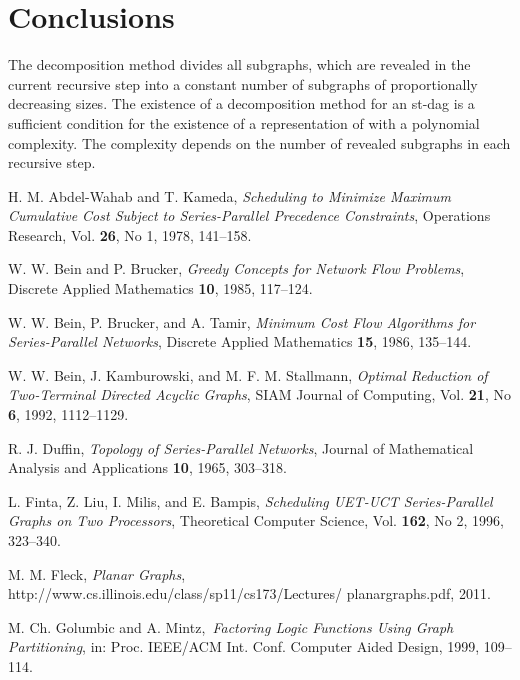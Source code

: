 \documentclass[11pt]{article}\usepackage{amsmath}
\begin{document}
\section{Conclusions}

The decomposition method divides all subgraphs, which are revealed in the
current recursive step into a constant number of subgraphs of proportionally
decreasing sizes. The existence of a decomposition method for an st-dag  is
a sufficient condition for the existence of a representation of  with a polynomial complexity. The complexity depends on the number
of revealed subgraphs in each recursive step.

\begin{thebibliography}{99}                                                                                               \setlength{\itemsep}{-2mm}

H. M. Abdel-Wahab and T. Kameda, \emph{Scheduling to Minimize
Maximum Cumulative Cost Subject to Series-Parallel Precedence Constraints},
Operations Research, Vol. \textbf{26}, No 1, 1978, 141--158.

W. W. Bein and P. Brucker, \emph{Greedy Concepts for Network
Flow Problems}, Discrete Applied Mathematics \textbf{10}, 1985, 117--124.

W. W. Bein, P. Brucker, and A. Tamir, \emph{Minimum Cost Flow
Algorithms for Series-Parallel Networks}, Discrete Applied Mathematics
\textbf{15}, 1986, 135--144.

W. W. Bein, J. Kamburowski, and M. F. M. Stallmann,
\emph{Optimal Reduction of Two-Terminal Directed Acyclic Graphs}, SIAM Journal
of Computing, Vol. \textbf{21}, No \textbf{6}, 1992, 1112--1129.

R. J. Duffin, \emph{Topology of Series-Parallel Networks},
Journal of Mathematical Analysis and Applications \textbf{10}, 1965, 303--318.

L. Finta, Z. Liu, I. Milis, and E. Bampis, \emph{Scheduling
UET-UCT Series-Parallel Graphs on Two Processors}, Theoretical Computer
Science, Vol. \textbf{162}, No 2, 1996, 323--340.

M. M. Fleck, \emph{Planar Graphs},
http://www.cs.illinois.edu/class/sp11/cs173/Lectures/\newline
planargraphs.pdf, 2011.

M. Ch. Golumbic and A. Mintz,\textit{\ }\emph{Factoring Logic
Functions Using Graph Partitioning}, in: Proc. IEEE/ACM Int. Conf. Computer
Aided Design, 1999, 109--114.


\end{thebibliography}
\end{document}
